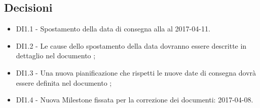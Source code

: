\documentclass[a4paper,titlepage]{article}
\begin{document}
 \subsection{Decisioni}
 \begin{itemize}
 \item DI1.1 - Spostamento della data di consegna alla \RP{} al 2017-04-11.
 \item DI1.2 - Le cause dello spostamento della data dovranno essere descritte in dettaglio nel documento \PPdocRP{};
  \item DI1.3 - Una nuova pianificazione che rispetti le nuove date di consegna dovrà essere definita nel documento \PPdocRP{};
  \item DI1.4 - Nuova Milestone fissata per la correzione dei documenti: 2017-04-08.
 \end{itemize}
\end{document}
